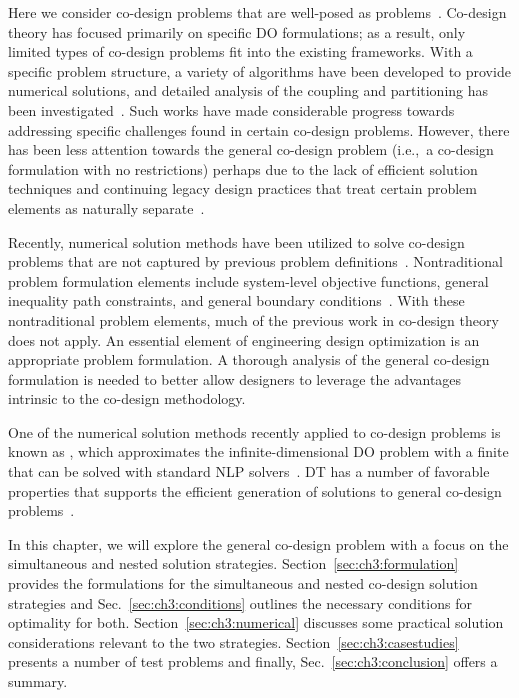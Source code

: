 Here we consider co-design problems that are well-posed as  problems~\cite{Fathy2001a, Allison2014a, Herber2014a}.
Co-design theory has focused primarily on specific DO formulations; as a result, only limited types of co-design problems fit into the existing frameworks.
With a specific problem structure, a variety of algorithms have been developed to provide numerical solutions, and detailed analysis of the coupling and partitioning has been investigated~\cite{Fathy2001a, Frischknecht2011a, Reyer2001a, Hale1985a, Eastep1987a, Sunar1993a, Peters2011a, Peters2009a}.
Such works have made considerable progress towards addressing specific challenges found in certain co-design problems.
However, there has been less attention towards the general co-design problem (i.e.,~a co-design formulation with no restrictions) perhaps due to the lack of efficient solution techniques and continuing legacy design practices that treat certain problem elements as naturally separate~\cite{Allison2014a}. 

Recently, numerical solution methods have been utilized to solve co-design problems that are not captured by previous problem definitions~\cite{Allison2014a, Herber2014a}.
Nontraditional problem formulation elements include system-level objective functions, general inequality path constraints, and general boundary conditions~\cite{Allison2013d, Allison2014b, Deshmukh2016a, Fathy2003a, Herber2013a, Maraniello2016a, Yan2009a, Chilan2017a}.
With these nontraditional problem elements, much of the previous work in co-design theory does not apply.
An essential element of engineering design optimization is an appropriate problem formulation.
A thorough analysis of the general co-design formulation is needed to better allow designers to leverage the advantages intrinsic to the co-design methodology.

One of the numerical solution methods recently applied to co-design problems is known as , which approximates the infinite-dimensional DO problem with a finite  that can be solved with standard NLP solvers~\cite{Betts2010a, Biegler2010a, Rao2010a, Allison2014b}. 
DT has a number of favorable properties that supports the efficient generation of solutions to general co-design problems~\cite{Allison2014a, Allison2014b, Herber2014a}.

In this chapter, we will explore the general co-design problem with a focus on the simultaneous and nested solution strategies.
Section~\ref{sec:ch3:formulation} provides the formulations for the simultaneous and nested co-design solution strategies and Sec.~\ref{sec:ch3:conditions} outlines the necessary conditions for optimality for both.
Section~\ref{sec:ch3:numerical} discusses some practical solution considerations relevant to the two strategies.
Section~\ref{sec:ch3:casestudies} presents a number of test problems and finally, Sec.~\ref{sec:ch3:conclusion} offers a summary.

